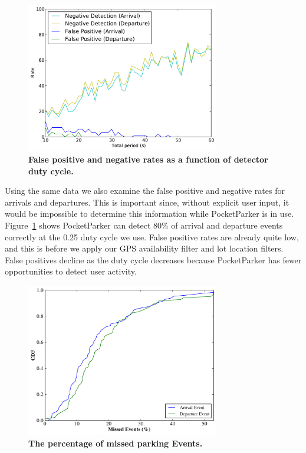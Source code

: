 \begin{figure}
\centering
\includegraphics[width=3.325in]{./figures/Rate_FP_and_ND.pdf}

\caption{\textbf{False positive and negative rates as a function of detector
duty cycle.}} 

\label{fig-falsepositives}
\end{figure}

Using the same data we also examine the false positive and negative rates for
arrivals and departures. This is important since, without explicit user
input, it would be impossible to determine this information while
PocketParker is in use. Figure~\ref{fig-falsepositives} shows PocketParker
can detect 80\% of arrival and departure events correctly at the 0.25 duty
cycle we use. False positive rates are already quite low, and this is before
we apply our GPS availability filter and lot location filters. False
positives decline as the duty cycle decreases because PocketParker has fewer
opportunities to detect user activity.

\begin{figure}[t]
\centering
\includegraphics[width=3.325in]{./figures/MissedEvents_CDF.pdf}

\caption{\textbf{The percentage of missed parking Events.}}

\label{fig-missedevents}
\end{figure}

